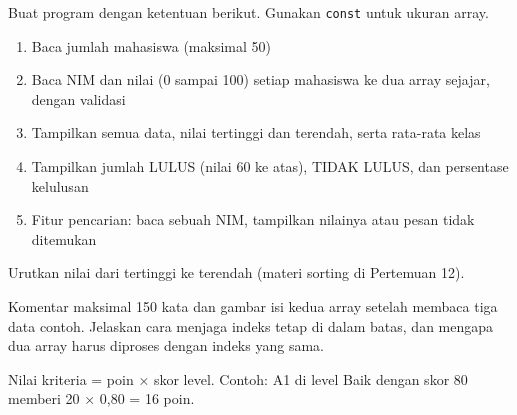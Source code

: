 \documentclass[a4paper]{article}
\begin{document}
Buat program dengan ketentuan berikut. Gunakan \texttt{const} untuk ukuran array.
\begin{enumerate}
\item Baca jumlah mahasiswa (maksimal 50)
\item Baca NIM dan nilai (0 sampai 100) setiap mahasiswa ke dua array sejajar, dengan validasi
\item Tampilkan semua data, nilai tertinggi dan terendah, serta rata-rata kelas
\item Tampilkan jumlah LULUS (nilai 60 ke atas), TIDAK LULUS, dan persentase kelulusan
\item Fitur pencarian: baca sebuah NIM, tampilkan nilainya atau pesan tidak ditemukan
\end{enumerate}
\begin{Contoh}
Urutkan nilai dari tertinggi ke terendah (materi sorting di Pertemuan 12).
\end{Contoh}
Komentar maksimal 150 kata dan gambar isi kedua array setelah membaca tiga data contoh. Jelaskan cara menjaga indeks tetap di dalam batas, dan mengapa dua array harus diproses dengan indeks yang sama.

\par\vspace{4pt}\par\vspace{6pt}
Nilai kriteria = poin × skor level. Contoh: A1 di level Baik dengan skor 80 memberi 20 × 0,80 = 16 poin.
\end{document}
